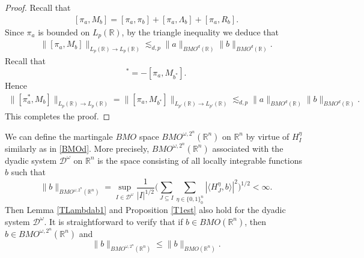 \documentclass[oneside,english,a4wide]{amsart}
\numberwithin{equation}{section}
\numberwithin{figure}{section}
\theoremstyle{plain}
\theoremstyle{plain}
\theoremstyle{definition}
\theoremstyle{plain}
\theoremstyle{remark}
\theoremstyle{definition}
\theoremstyle{remark}
\theoremstyle{definition}
\newcommand{\8}{\infty}
\begin{document}
\begin{proof}
	Recall that
	\begin{equation*}
		\begin{aligned}
			[\pi_{{a}},M_b]=[\pi_{{a}},\pi_b]+[\pi_{{a}},\varLambda_b]+[\pi_{{a}},R_b].
		\end{aligned}
	\end{equation*}
	Since $\pi_a$ is bounded on $L_p(\mathbb{R})$, by the triangle inequality we deduce that
	\begin{equation*}
		\begin{aligned}
			\|[\pi_a,M_b]\|_{L_p(\mathbb{R})\to L_p(\mathbb{R})}\lesssim_{d,p} \|a\|_{BMO^d(\mathbb{R})}\|b\|_{BMO^d(\mathbb{R})}.
		\end{aligned}
	\end{equation*}
	Recall that 
\begin{equation*}
	[\pi_a^*,M_b]^*=-[\pi_a,M_{b^*}].
\end{equation*}
Hence
\begin{equation*}
	\begin{aligned}
		\|[\pi_a^*,M_b]\|_{L_p(\mathbb{R})\to L_p(\mathbb{R})}=\|[\pi_a,M_{b^*}]\|_{L_{p'}(\mathbb{R})\to L_{p'}(\mathbb{R})}\lesssim_{d,p} \|a\|_{BMO^d(\mathbb{R})}\|b\|_{BMO^d(\mathbb{R})}.
	\end{aligned}
\end{equation*}
	This completes the proof.
\end{proof}



We can define the martingale $BMO$ space $BMO^{\omega, 2^n}(\mathbb{R}^n)$ on $\mathbb{R}^n$ by virtue of $H_I^\eta$ similarly as in \eqref{BMOd}. More precisely, $BMO^{\omega, 2^n}(\mathbb{R}^n)$ associated with the dyadic system $\mathcal{ D}^\omega$ on $\mathbb{R}^n$ is the space consisting of all locally integrable functions $b$ such that
\begin{equation}
\|b\|_{BMO^{\omega, 2^n}(\mathbb{R}^n)}=\sup_{I\in\mathcal{D}^\omega}\frac{1}{|I|^{1/2}}\biggl(\sum_{J\subseteq I}\sum_{\eta\in\{0,1\}^n_0}|\langle H_J^\eta,b\rangle|^2 \biggr)^{1/2}<\infty.
\end{equation}
Then Lemma \ref{TLambdab1} and Proposition \ref{T1est} also hold for the dyadic system $\mathcal{ D}^\omega$. It is straightforward to verify that if $b\in BMO(\mathbb{R}^n) $, then $b\in BMO^{\omega, 2^n}(\mathbb{R}^n)$ and
$$ 	\|b\|_{BMO^{\omega, 2^n}(\mathbb{R}^n)}\leq 	\|b\|_{BMO(\mathbb{R}^n)}. $$
\end{document}
